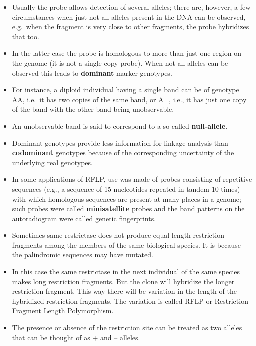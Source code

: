 \documentclass[11pt,dvipsnames,ignorenonframetext,aspectratio=169]{beamer}
\providecommand{\tightlist}{%
  \setlength{\itemsep}{0pt}\setlength{\parskip}{0pt}}
\begin{document}
\begin{frame}{}
\protect\hypertarget{section-22}{}
\begin{itemize}
\tightlist
\item
  Usually the probe allows detection of several alleles; there are,
  however, a few circumstances when just not all alleles present in the
  DNA can be observed, e.g.~when the fragment is very close to other
  fragments, the probe hybridizes that too.
\item
  In the latter case the probe is homologous to more than just one
  region on the genome (it is not a single copy probe). When not all
  alleles can be observed this leads to \textbf{dominant} marker
  genotypes.
\item
  For instance, a diploid individual having a single band can be of
  genotype AA, i.e.~it has two copies of the same band, or A\_, i.e., it
  has just one copy of the band with the other band being unobservable.
\end{itemize}
\end{frame}

\begin{frame}{}
\protect\hypertarget{section-23}{}
\begin{itemize}
\tightlist
\item
  An unobservable band is said to correspond to a so-called
  \textbf{null-allele}.
\item
  Dominant genotypes provide less information for linkage analysis than
  \textbf{codominant} genotypes because of the corresponding uncertainty
  of the underlying real genotypes.
\item
  In some applications of RFLP, use was made of probes consisting of
  repetitive sequences (e.g., a sequence of 15 nucleotides repeated in
  tandem 10 times) with which homologous sequences are present at many
  places in a genome; such probes were called \textbf{minisatellite}
  probes and the band patterns on the autoradiogram were called genetic
  fingerprints.
\end{itemize}
\end{frame}

\begin{frame}{}
\protect\hypertarget{section-24}{}
\begin{itemize}
\tightlist
\item
  Sometimes same restrictase does not produce equal length restriction
  fragments among the members of the same biological species. It is
  because the palindromic sequences may have mutated.
\item
  In this case the same restrictase in the next individual of the same
  species makes long restriction fragments. But the clone will hybridize
  the longer restriction fragment. This way there will be variation in
  the length of the hybridized restriction fragments. The variation is
  called RFLP or Restriction Fragment Length Polymorphism.
\item
  The presence or absence of the restriction site can be treated as two
  alleles that can be thought of as + and -- alleles.
\end{itemize}
\end{frame}
\end{document}
